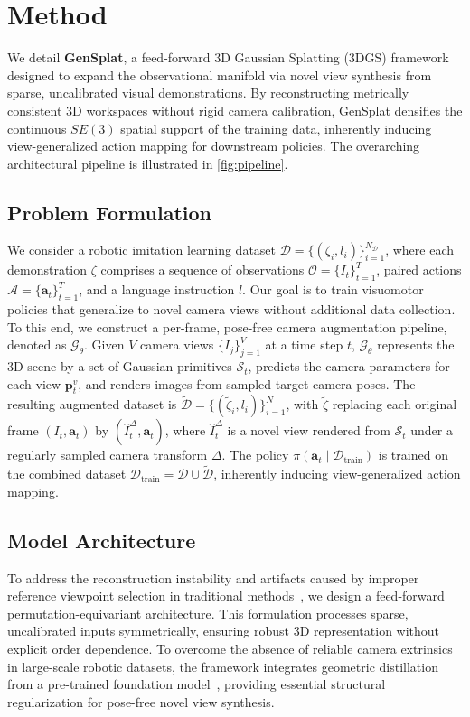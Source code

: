 \section{Method}
\label{sec:Methodology}
We detail \textbf{GenSplat}, a feed-forward 3D Gaussian Splatting (3DGS) framework designed to expand the observational manifold via novel view synthesis from sparse, uncalibrated visual demonstrations. By reconstructing metrically consistent 3D workspaces without rigid camera calibration, GenSplat densifies the continuous $SE(3)$ spatial support of the training data, inherently inducing view-generalized action mapping for downstream policies. The overarching architectural pipeline is illustrated in \cref{fig:pipeline}.

\subsection{Problem Formulation}
We consider a robotic imitation learning dataset \( \mathcal{D}=\{(\zeta_i, l_i)\}_{i=1}^{N_\mathcal{D}} \), where each demonstration \(\zeta\) comprises a sequence of observations \(\mathcal{O}=\{I_t\}_{t=1}^T\), paired actions \(\mathcal{A}=\{\boldsymbol{a}_t\}_{t=1}^T\), and a language instruction \(l\). Our goal is to train visuomotor policies that generalize to novel camera views without additional data collection.
To this end, we construct a per-frame, pose-free camera augmentation pipeline, denoted as $\mathcal{G}_\theta$. Given $V$ camera views $\{I_j\}_{j=1}^{V}$ at a time step $t$, $\mathcal{G}_\theta$ represents the 3D scene by a set of Gaussian primitives $\mathcal{S}_t$, predicts the camera parameters for each view $\boldsymbol{p}_t^{v}$, and renders images from sampled target camera poses. The resulting augmented dataset is $\tilde{\mathcal{D}}=\{(\tilde{\zeta}_i, l_i)\}_{i=1}^{N}$, with $\tilde{\zeta}$ replacing each original frame $(I_t, \boldsymbol{a}_t)$ by $(\hat{I}^{\Delta}_{t}, \boldsymbol{a}_t)$, where $\hat{I}^{\Delta}_{t}$ is a novel view rendered from $\mathcal{S}_t$ under a regularly sampled camera transform $\Delta$. The policy $\pi(\boldsymbol{a}_t \mid \mathcal{D}_{\text{train}})$ is trained on the combined dataset $\mathcal{D}_{\text{train}}=\mathcal{D} \cup \tilde{\mathcal{D}}$, inherently inducing view-generalized action mapping.


\subsection{Model Architecture} 
\label{sec3.2 Model Architecture}
To address the reconstruction instability and artifacts caused by improper reference viewpoint selection in traditional methods~\cite{wang2025vggt,keetha2025mapanything,wang2024dust3r}, we design a feed-forward permutation-equivariant architecture. This formulation processes sparse, uncalibrated inputs symmetrically, ensuring robust 3D representation without explicit order dependence. 
To overcome the absence of reliable camera extrinsics in large-scale robotic datasets, the framework integrates geometric distillation from a pre-trained foundation model~\cite{wang2025pi}, providing essential structural regularization for pose-free novel view synthesis.



